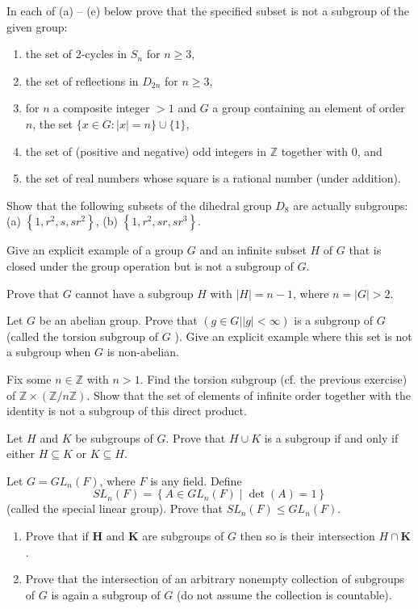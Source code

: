 \begin{questions}
\question
In each of (a) -- (e) below prove that the specified subset is not a subgroup of the given group:
\begin{enumerate}[label=(\alph*)]
    \item the set of 2-cycles in \(S_n\) for \(n \geq 3\),
    \item the set of reflections in \(D_{2 n}\) for \(n \geq 3\),
    \item for \(n\) a composite integer \(>1\) and \(G\) a group containing an element of order \(n\), the set \(\{x \in G : | x |=n\} \cup\{1\}\),
    \item the set of (positive and negative) odd integers in \(\mathbb{Z}\) together with 0, and
    \item the set of real numbers whose square is a rational number (under addition).
\end{enumerate}

\question
Show that the following subsets of the dihedral group \(D_8\) are actually subgroups:
(a) \(\left\{1, r^2, s, s r^2\right\}\),
(b) \(\left\{1, r^2, s r, s r^3\right\}\).

\question
Give an explicit example of a group \(G\) and an infinite subset \(H\) of \(G\) that is closed under the group operation but is not a subgroup of \(G\).

\question
Prove that \(G\) cannot have a subgroup \(H\) with \(|H|=n-1\), where \(n=|G|>2\).


\question
Let \(G\) be an abelian group. Prove that \((g \in G|| g \mid<\infty)\) is a subgroup of \(G\) (called the torsion subgroup of \(G\) ). Give an explicit example where this set is not a subgroup when \(G\) is non-abelian.


\question
Fix some \(n \in \mathbb{Z}\) with \(n>1\). Find the torsion subgroup (cf. the previous exercise) of \(\mathbb{Z} \times(\mathbb{Z} / n \mathbb{Z})\). Show that the set of elements of infinite order together with the identity is not a subgroup of this direct product.


\question
Let \(H\) and \(K\) be subgroups of \(G\). Prove that \(H \cup K\) is a subgroup if and only if either \(H \subseteq K\) or \(K \subseteq H\).


\question
Let \(G=G L_n(F)\), where \(F\) is any field. Define
\[
S L_n(F)=\left\{A \in G L_n(F) \mid \operatorname{det}(A)=1\right\}
\]
(called the special linear group). Prove that \(S L_n(F) \leq G L_n(F)\).


\question
\begin{enumerate}[label=(\roman*)]
    \item Prove that if \(\boldsymbol{H}\) and \(\boldsymbol{K}\) are subgroups of \(G\) then so is their intersection \(H \cap \boldsymbol{K}\).
    \item Prove that the intersection of an arbitrary nonempty collection of subgroups of \(G\) is again a subgroup of \(G\) (do not assume the collection is countable).
\end{enumerate}




\end{questions}
